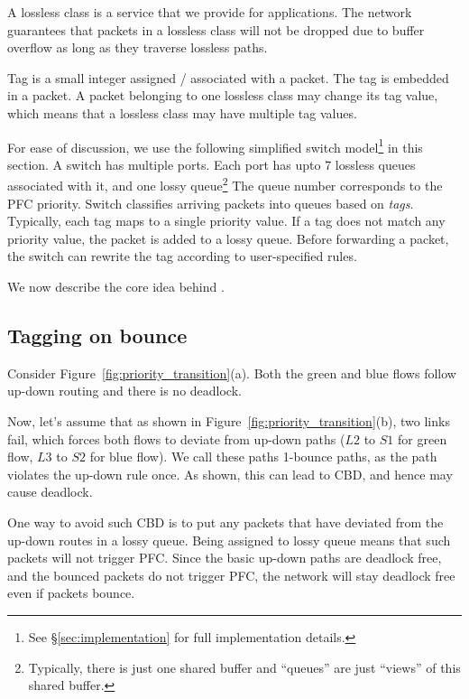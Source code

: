  A lossless class is a service that we provide for
applications. The network guarantees that packets in a lossless class will
not be dropped due to buffer overflow as long as they traverse lossless paths.

 Tag is a small integer assigned / associated with a packet. The tag
is embedded in a packet. A packet belonging to one lossless class may change its
tag value, which means that a lossless class may have multiple tag values.

 For ease of discussion, we use the following simplified
switch model\footnote{See \S\ref{sec:implementation} for full implementation
details.} in this section.  A switch has multiple ports. Each port has upto 7
lossless queues associated with it, and one lossy queue\footnote{Typically,
there is just one shared buffer and ``queues'' are just ``views'' of this shared
buffer.} The queue number corresponds to the PFC priority.  Switch classifies
arriving packets into queues based on {\em tags}.  Typically, each tag maps to a
single priority value. If a tag does not match any priority value, the packet is
added to a lossy queue. Before forwarding a packet, the switch can rewrite the
tag according to user-specified rules.

We now describe the core idea behind \sysname{}.

\subsection{Tagging on bounce}
\label{subsec:tag}

Consider Figure~\ref{fig:priority_transition}(a). Both the green and blue flows
follow up-down routing and there is no deadlock. 

Now, let's assume that as shown in Figure~\ref{fig:priority_transition}(b), two
links fail, which forces both flows to deviate from up-down paths ($L2$ to
$S1$ for green flow, $L3$ to $S2$ for blue flow). We call these paths 1-bounce
paths, as the path violates the up-down rule once. As shown, this can lead to
CBD, and hence may cause deadlock.

One way to avoid such CBD is to put any packets that have deviated from the
up-down routes in a lossy queue.  Being assigned to lossy queue means that such
packets will not trigger PFC. Since the basic up-down paths are deadlock free,
and the bounced packets do not trigger PFC, the network will stay deadlock free
even if packets bounce.

